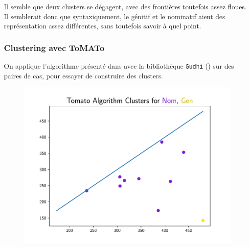\documentclass{cours}
\begin{document}
Il semble que deux clusters se dégagent, avec des frontières toutefois assez floues.
Il semblerait donc que syntaxiquement, le génitif et le nominatif aient des représentation assez différentes, sans toutefois savoir à quel point.

\subsubsection{Clustering avec ToMATo}\label{subsub:tomato}
On applique l'algorithme présenté dans \cite{ToMATo} avec la bibliothèque \texttt{Gudhi} (\cite{Gudhi}) sur des paires de cas, pour essayer de construire des clusters.
\begin{figure}[H]

\begin{center}
\begin{minipage}{.5\textwidth}
	\begin{center}
	\includegraphics[width=\linewidth]{Figures/Visualisations/tomato_Nom_Gen_Nouns}
	\end{center}
\end{minipage}
\end{center}


\end{figure}
\end{document}
